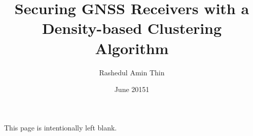 \documentclass{article}
\title{\textbf{Securing GNSS Receivers with a Density-based Clustering Algorithm}}
\date{June 20151}
\author{Rashedul Amin Thin}
\begin{document}
 
\newpage
 \maketitle
This page is intentionally left blank.
\end{document}
